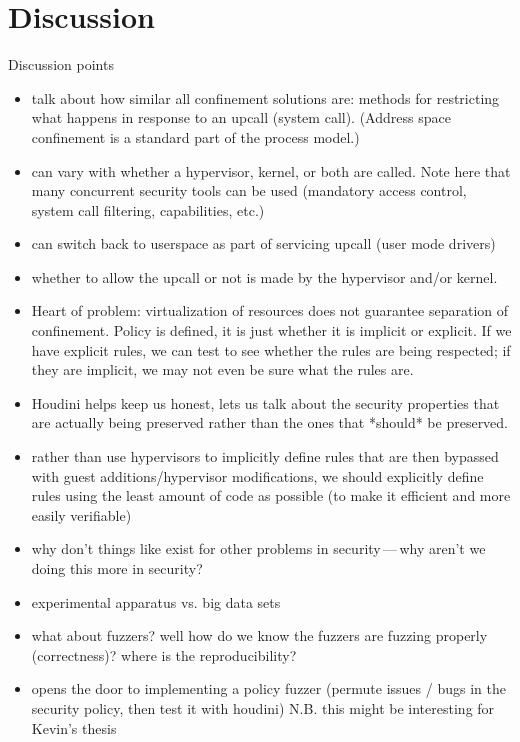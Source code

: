 \section{Discussion}
\label{sec:discussion}

Discussion points
\begin{itemize}
\item talk about how similar all confinement solutions are: methods for restricting what happens in response to an upcall (system call).  (Address space confinement is a standard part of the process model.)
\item can vary with whether a hypervisor, kernel, or both are called. Note here that many concurrent security tools can be used (mandatory access control, system call filtering, capabilities, etc.)
\item can switch back to userspace as part of servicing upcall (user mode drivers)
\item whether to allow the upcall or not is made by the hypervisor and/or kernel.
\item Heart of problem: virtualization of resources does not guarantee separation of confinement.  Policy is defined, it is just whether it is implicit or explicit.  If we have explicit rules, we can test to see whether the rules are being respected; if they are implicit, we may not even be sure what the rules are.
\item Houdini helps keep us honest, lets us talk about the security properties that are actually being preserved rather than the ones that *should* be preserved.
\item rather than use hypervisors to implicitly define rules that are then bypassed with guest additions/hypervisor modifications, we should explicitly define rules using the least amount of code as possible (to make it efficient and more easily verifiable)
\item why don't things like \houdini exist for other problems in security\,---\,why aren't we doing this more in security?
\item experimental apparatus vs\@. big data sets
\item what about fuzzers? well how do we know the fuzzers are fuzzing properly (correctness)? where is the reproducibility?
\item \houdini opens the door to implementing a policy fuzzer (permute issues / bugs in the security policy, then test it with houdini) N.B\@. this might be interesting for Kevin's thesis
\end{itemize}

